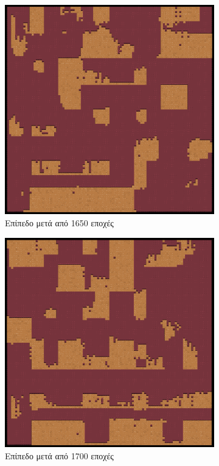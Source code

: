 \begin{figure}[H]
\begin{subfigure}{.5\textwidth}
  \centering
  \includegraphics[width=.8\linewidth]{../images/generated/1650.png}
  \caption{Επίπεδο μετά από 1650 εποχές}
  \label{fig:sfig1}
\end{subfigure}%
\begin{subfigure}{.5\textwidth}
  \centering
  \includegraphics[width=.8\linewidth]{../images/generated/1700.png}
  \caption{Επίπεδο μετά από 1700 εποχές}
  \label{fig:sfig2}
\end{subfigure}
\begin{subfigure}{.5\textwidth}

\end{subfigure}
\end{figure}
